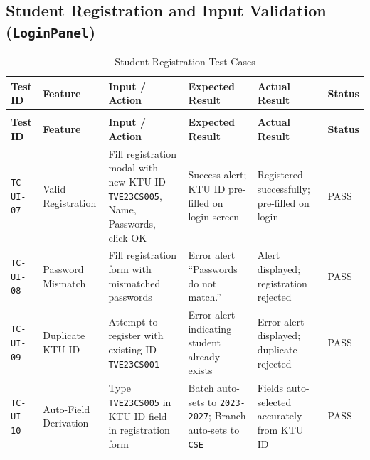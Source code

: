 \subsection{Student Registration and Input Validation (\texttt{LoginPanel})}
{\footnotesize
\setlength{\tabcolsep}{3pt}
\begin{longtable}{>{\raggedright\arraybackslash}p{1.6cm} >{\raggedright\arraybackslash}p{2.1cm} >{\raggedright\arraybackslash}p{2.5cm} >{\raggedright\arraybackslash}p{3.1cm} >{\raggedright\arraybackslash}p{3.1cm} >{\centering\arraybackslash}p{1.4cm}}
\caption{Student Registration Test Cases} \label{tab:test_ui_reg} \\
\toprule
\textbf{Test ID} & \textbf{Feature} & \textbf{Input / Action} & \textbf{Expected Result} & \textbf{Actual Result} & \textbf{Status} \\
\midrule
\endfirsthead
\multicolumn{6}{c}{{\bfseries Table \thetable\ continued from previous page}} \\
\toprule
\textbf{Test ID} & \textbf{Feature} & \textbf{Input / Action} & \textbf{Expected Result} & \textbf{Actual Result} & \textbf{Status} \\
\midrule
\endhead
\bottomrule
\endfoot
\texttt{TC-UI-07} & Valid Registration & Fill registration modal with new KTU ID \texttt{TVE23CS005}, Name, Passwords, click OK & Success alert; KTU ID pre-filled on login screen & Registered successfully; pre-filled on login & PASS \\
\midrule
\texttt{TC-UI-08} & Password Mismatch & Fill registration form with mismatched passwords & Error alert ``Passwords do not match.'' & Alert displayed; registration rejected & PASS \\
\midrule
\texttt{TC-UI-09} & Duplicate KTU ID & Attempt to register with existing ID \texttt{TVE23CS001} & Error alert indicating student already exists & Error alert displayed; duplicate rejected & PASS \\
\midrule
\texttt{TC-UI-10} & Auto-Field Derivation & Type \texttt{TVE23CS005} in KTU ID field in registration form & Batch auto-sets to \texttt{2023-2027}; Branch auto-sets to \texttt{CSE} & Fields auto-selected accurately from KTU ID & PASS \\
\end{longtable}
}

